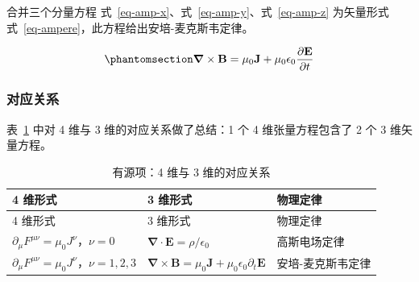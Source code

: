 \documentclass[
  chinese,
  a4paper,
  UTF8,
  12pt,
  oneside,
  openany]{ctexbook}
\theoremstyle{plain}
\theoremstyle{plain}
\theoremstyle{plain}
\theoremstyle{definition}
\theoremstyle{plain}
\theoremstyle{plain}
\theoremstyle{remark}
\begin{document}
合并三个分量方程 式~\ref{eq-amp-x}、式~\ref{eq-amp-y}、式~\ref{eq-amp-z}
为矢量形式 式~\ref{eq-ampere}，此方程给出安培-麦克斯韦定律。

\begin{equation}\protect\phantomsection\label{eq-ampere}{
\boldsymbol{\nabla} \times \mathbf{B} = \mu_{0}\mathbf{J} + \mu_{0}\epsilon_{0}\frac{\partial\mathbf{E}}{\partial t}
}\end{equation}

\subsubsection{对应关系}\label{ux5bf9ux5e94ux5173ux7cfb}

表~\ref{tbl-sourceful} 中对 4 维与 3 维的对应关系做了总结：1 个 4
维张量方程包含了 2 个 3 维矢量方程。

\begin{longtable}[]{@{}
  >{\raggedright\arraybackslash}p{}
  >{\raggedright\arraybackslash}p{}
  >{\raggedright\arraybackslash}p{}@{}}
\caption{有源项：4 维与 3
维的对应关系}\label{tbl-sourceful}\tabularnewline
\toprule\noalign{}
\begin{minipage}[b]{\linewidth}\raggedright
4 维形式
\end{minipage} & \begin{minipage}[b]{\linewidth}\raggedright
3 维形式
\end{minipage} & \begin{minipage}[b]{\linewidth}\raggedright
物理定律
\end{minipage} \\
\midrule\noalign{}
\endfirsthead
\toprule\noalign{}
\begin{minipage}[b]{\linewidth}\raggedright
4 维形式
\end{minipage} & \begin{minipage}[b]{\linewidth}\raggedright
3 维形式
\end{minipage} & \begin{minipage}[b]{\linewidth}\raggedright
物理定律
\end{minipage} \\
\midrule\noalign{}
\endhead
\bottomrule\noalign{}
\endlastfoot
\(\partial_\mu F^{\mu\nu} = \mu_0 J^\nu\)，\(\nu = 0\) &
\(\boldsymbol{\nabla} \cdot \mathbf{E} = \rho/\epsilon_0\) &
高斯电场定律 \\
\(\partial_\mu F^{\mu\nu} = \mu_0 J^\nu\)，\(\nu = 1,2,3\) &
\(\boldsymbol{\nabla} \times \mathbf{B} = \mu_0 \mathbf{J} + \mu_0 \epsilon_0 \partial_t \mathbf{E}\)
& 安培-麦克斯韦定律 \\
\end{longtable}
\end{document}
